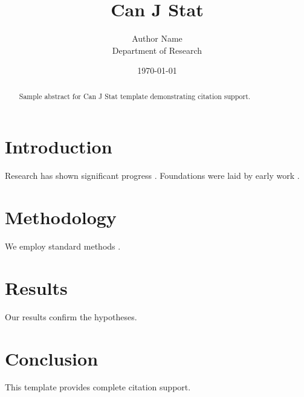 \documentclass{wiley-nj}
\title{Can J Stat}
\author{Author Name \\ \small Department of Research}
\date{\today}
\begin{document}
\maketitle

\begin{abstract}
Sample abstract for Can J Stat template demonstrating citation support.
\end{abstract}

\section{Introduction}
Research has shown significant progress \citep{einstein1905}. Foundations were laid by early work \citep{turing1950}.

\section{Methodology}
We employ standard methods \citep{knuth1984}.

\section{Results}
Our results confirm the hypotheses.

\section{Conclusion}
This template provides complete citation support.



\end{document}
